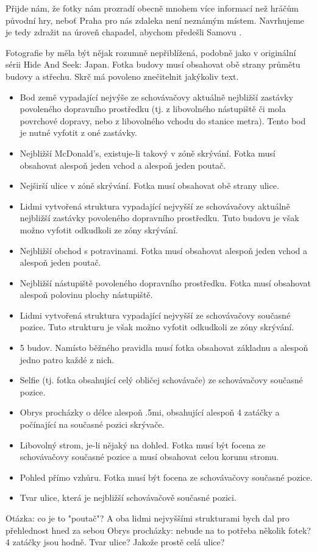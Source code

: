 \begin{reasoning}
	Přijde nám, že fotky nám prozradí obecně mnohem více informací než hráčům původní hry, neboť Praha pro nás zdaleka není neznámým místem. Navrhujeme je tedy zdražit na úroveň chapadel, abychom předešli Samovu .
\end{reasoning}

Fotografie by měla být nějak rozumně nepřiblížená, podobně jako v originální sérii Hide And Seek: Japan. Fotka budovy musí obsahovat obě strany průmětu budovy a střechu. Skrč má povoleno znečitelnit jakýkoliv text.

\begin{itemize}
	\item Bod země vypadající nejvýše ze schovávačovy aktuálně nejbližší zastávky povoleného dopravního prostředku (tj. z libovolného nástupiště či mola povrchové dopravy, nebo z libovolného vchodu do stanice metra). Tento bod je nutné vyfotit z oné zastávky.
	\item Nejbližší McDonald's, existuje-li takový v zóně skrývání. Fotka musí obsahovat alespoň jeden vchod a alespoň jeden poutač.
	\item Nejširší ulice v zóně skrývání. Fotka musí obsahovat obě strany ulice.
	\item Lidmi vytvořená struktura vypadající nejvyšší ze schovávačovy aktuálně nejbližší zastávky povoleného dopravního prostředku. Tuto budovu je však možno vyfotit odkudkoli ze zóny skrývání.
	\item Nejbližší obchod s potravinami. Fotka musí obsahovat alespoň jeden vchod a alespoň jeden poutač.
	\item Nejbližší nástupiště povoleného dopravního prostředku. Fotka musí obsahovat alespoň polovinu plochy nástupiště.
	\item Lidmi vytvořená struktura vypadající nejvyšší ze schovávačovy současné pozice. Tuto strukturu je však možno vyfotit odkudkoli ze zóny skrývání.
	\item 5 budov. Namísto běžného pravidla musí fotka obsahovat základnu a alespoň jedno patro každé z nich.
	\item Selfie (tj. fotka obsahující celý obličej schovávače) ze schovávačovy současné pozice.
	\item Obrys procházky o délce alespoň \dist.5mi, obsahující alespoň 4 zatáčky a počínající na současné pozici skrývače.
	\item Libovolný strom, je-li nějaký na dohled. Fotka musí být focena ze schovávačovy současné pozice a musí obsahovat celou korunu stromu.
	\item Pohled přímo vzhůru. Fotka musí být focena ze schovávačovy současné pozice.
	\item Tvar ulice, která je nejbližší schovávačově současné pozici.
\end{itemize}

Otázka: co je to "poutač"? A oba lidmi nejvyššími strukturami bych dal pro přehlednost hned za sebou
Obrys procházky: nebude na to potřeba několik fotek? 4 zatáčky jsou hodně.
Tvar ulice? Jakože prostě celá ulice?
